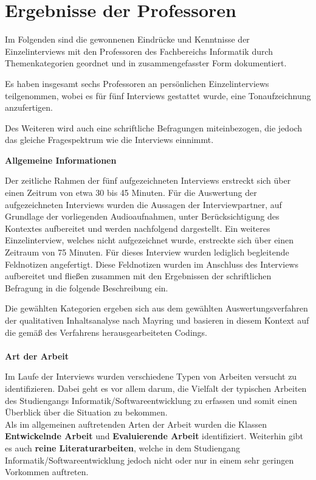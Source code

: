 \documentclass{scrreprt}
\begin{document}
\section{Ergebnisse der Professoren}
\par Im Folgenden sind die gewonnenen Eindrücke und Kenntnisse der Einzelinterviews mit den Professoren des Fachbereichs Informatik durch Themenkategorien geordnet und in zusammengefasster Form dokumentiert.
\par Es haben insgesamt sechs Professoren an persönlichen Einzelinterviews teilgenommen, wobei es für fünf Interviews gestattet wurde, eine Tonaufzeichnung anzufertigen.\\
\par Des Weiteren wird auch eine schriftliche Befragungen miteinbezogen, die jedoch das gleiche Fragespektrum wie die Interviews einnimmt. \\
\par \textbf{Allgemeine Informationen}
\par Der zeitliche Rahmen der fünf aufgezeichneten Interviews erstreckt sich über einen Zeitrum von etwa 30 bis 45 Minuten. Für die Auswertung der aufgezeichneten Interviews wurden die Aussagen der Interviewpartner, auf Grundlage der vorliegenden Audioaufnahmen, unter Berücksichtigung des Kontextes aufbereitet und werden nachfolgend dargestellt. Ein weiteres Einzelinterview, welches nicht aufgezeichnet wurde, erstreckte sich über einen Zeitraum von 75 Minuten. Für dieses Interview wurden lediglich begleitende Feldnotizen angefertigt. Diese Feldnotizen wurden im Anschluss des Interviews aufbereitet und fließen zusammen mit den Ergebnissen der schriftlichen Befragung in die folgende Beschreibung ein.\\
\par Die gewählten Kategorien ergeben sich aus dem gewählten Auswertungsverfahren der qualitativen Inhaltsanalyse nach Mayring\cite{Mayring2015} und basieren in diesem Kontext auf die gemäß des Verfahrens herausgearbeiteten Codings.\\\\


\textbf{Art der Arbeit}
\par Im Laufe der Interviews wurden verschiedene Typen von Arbeiten versucht zu identifizieren. Dabei geht es vor allem darum, die Vielfalt der typischen Arbeiten des Studiengangs Informatik/Softwareentwicklung zu erfassen und somit einen Überblick über die Situation zu bekommen.\\
Als im allgemeinen auftretenden Arten der Arbeit wurden die Klassen \textbf{Entwickelnde Arbeit}  und \textbf{Evaluierende Arbeit} identifiziert. Weiterhin gibt es auch \textbf{reine Literaturarbeiten}, welche in dem Studiengang Informatik/Softwareentwicklung jedoch nicht oder nur in einem sehr geringen Vorkommen auftreten.\\
\end{document}

